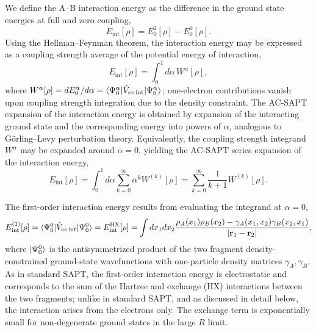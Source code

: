 \documentclass[journal=jctcce,manuscript=article]{achemso}
\begin{document}
We define the A--B interaction energy as the difference in the ground
state energies at full and zero coupling,
\begin{equation}
  E_{\text{int}}[\rho] =
  E^1_0[\rho] - E^0_0[\rho].
\end{equation}
Using the Hellman--Feynman theorem, the interaction energy may be
expressed as a coupling strength 
average of the potential energy of interaction\cite{PhysRevA.82.024501},
\begin{equation}
  E_{\text{int}}[\rho] = \int_0^1 d\alpha\, W^\alpha[\rho],
\end{equation}
where $W^\alpha[\rho] = dE_0^{\alpha}/d\alpha = \braket{ \Psi^\alpha_0 |
    \hat{V}_{ee \,\text{int}} | \Psi^\alpha_0 }$;
one-electron contributions vanish upon coupling strength integration due
to the density constraint. The AC-SAPT expansion of the interaction
energy is obtained by expansion of the interacting ground state
and the corresponding energy into powers of $\alpha$, analogous to
G{\"o}rling--Levy perturbation theory.\cite{PhysRevB.47.13105,PhysRevA.52.4493}
Equivalently, the coupling strength integrand $W^\alpha$ may be expanded around
$\alpha=0$, yielding the AC-SAPT series expansion of the interaction
energy, 
\begin{equation}
  \label{eq:acsapt}
  E_{\text{int}}[\rho] = \int_0^1 d\alpha \sum_{k = 0}^{\infty} \alpha^k
  W^{(k)}[\rho] = \sum_{k=0}^{\infty} \frac{1}{k+1} W^{(k)}[\rho].
\end{equation}

The first-order interaction energy results from evaluating the integrand
at $\alpha=0$, 
\begin{equation}
  E_{\text{int}}^{(1)}[\rho] = \braket{ \Psi^0_0 |
    \hat{V}_{ee \,\text{int}} | \Psi^0_0 } = E^{\text{HX}}_{\text{int}}[\rho] = 
  \int dx_1 dx_2 \frac{ \rho_A(x_1)
    \rho_B(x_2) - \gamma_A(x_1,x_2)\gamma_B(x_2,x_1) }{|\mathbf{r}_1-\mathbf{r}_2|},
\end{equation}
where $\ket{\Psi^0_0}$ is the antisymmetrized
product of the two fragment density-constrained ground-state
wavefunctions with one-particle 
density matrices $\gamma_A, \gamma_B$. As in standard SAPT, the
first-order interaction 
energy is electrostatic and corresponds to the sum of the Hartree
and exchange (HX) interactions between the two fragments; unlike in standard
SAPT, and as discussed in detail below, the interaction arises from the
electrons only. The exchange term 
is exponentially small for non-degenerate ground states in the large $R$
limit. 
\end{document}
